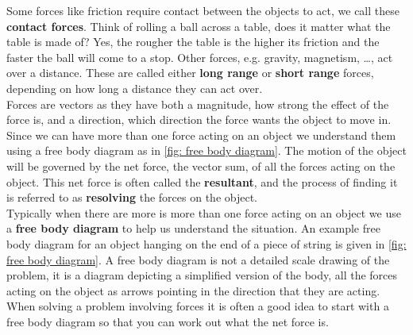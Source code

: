 \documentclass[a4paper,12pt]{book}
\begin{document}
Some forces like friction require contact between the objects to act, we call these \textbf{contact forces}. Think of rolling a ball across a table, does it matter what the table is made of? Yes, the rougher the table is the higher its friction and the faster the ball will come to a stop. Other forces, e.g. gravity, magnetism, \dots{}, act over a distance. These are called either \textbf{long range} or \textbf{short range} forces, depending on how long a distance they can act over. \\

Forces are vectors as they have both a magnitude, how strong the effect of the force is, and a direction, which direction the force wants the object to move in.  Since we can have more than one force acting on an object we understand them using a free body diagram as in \cref{fig: free body diagram}. The motion of the object will be governed by the net force, the vector sum, of all the forces acting on the object. This net force is often called the \textbf{resultant}, and the process of finding it is referred to as \textbf{resolving} the forces on the object.\\

Typically when there are more is more than one force acting on an object we use a \textbf{free body diagram} to help us understand the situation. An example free body diagram for an object hanging on the end of a piece of string is given in \cref{fig: free body diagram}.  A free body diagram is not a detailed scale drawing of the problem, it is a diagram depicting a simplified version of the body, all the forces acting on the object as arrows pointing in the direction that they are acting. When solving a problem involving forces it is often a good idea to start with a free body diagram so that you can work out what the net force is.
\end{document}
